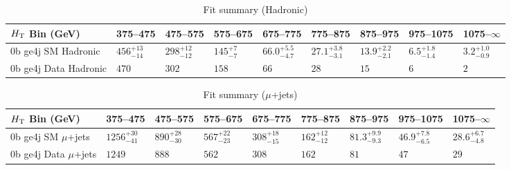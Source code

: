 \documentclass[8pt]{article}
\def\scalht{\mbox{$H_{\rm{T}}$}\xspace}
\newcommand\T{\rule{0pt}{2.6ex}}
\begin{document}
\begin{table}[ht!]
\caption{Fit summary (Hadronic)}
\label{tab:ensemble-summary}
\centering
\begin{tabular}{ lllllllll }

\hline
\scalht Bin (GeV)       & 375--475                       & 475--575                       & 575--675                       & 675--775                       & 775--875                       & 875--975                       & 975--1075                      & 1075--$\infty$                 \\ [1.000000ex]
\hline
0b ge4j SM Hadronic\T   & $456^{+13}_{-14}$              & $298^{+12}_{-12}$              & $145^{+7}_{-7}$                & $66.0^{+5.5}_{-4.7}$           & $27.1^{+3.8}_{-3.1}$           & $13.9^{+2.2}_{-2.1}$           & $6.5^{+1.8}_{-1.4}$            & $3.2^{+1.0}_{-0.9}$            \\ 
0b ge4j Data Hadronic\T & $470$                          & $302$                          & $158$                          & $66$                           & $28$                           & $15$                           & $6$                            & $2$                            \\ 
\hline

\end{tabular}
\end{table}
\begin{table}[ht!]
\caption{Fit summary ($\mu$+jets)}
\label{tab:ensemble-summary}
\centering
\begin{tabular}{ lllllllll }

\hline
\scalht Bin (GeV)       & 375--475                       & 475--575                       & 575--675                       & 675--775                       & 775--875                       & 875--975                       & 975--1075                      & 1075--$\infty$                 \\ [1.000000ex]
\hline
0b ge4j SM $\mu$+jets\T & $1256^{+30}_{-41}$             & $890^{+28}_{-30}$              & $567^{+22}_{-23}$              & $308^{+18}_{-15}$              & $162^{+12}_{-12}$              & $81.3^{+9.9}_{-9.3}$           & $46.9^{+7.8}_{-6.5}$           & $28.6^{+6.7}_{-4.8}$           \\ 
0b ge4j Data $\mu$+jets\T & $1249$                         & $888$                          & $562$                          & $308$                          & $162$                          & $81$                           & $47$                           & $29$                           \\ 
\hline

\end{tabular}
\end{table}
\end{document}
